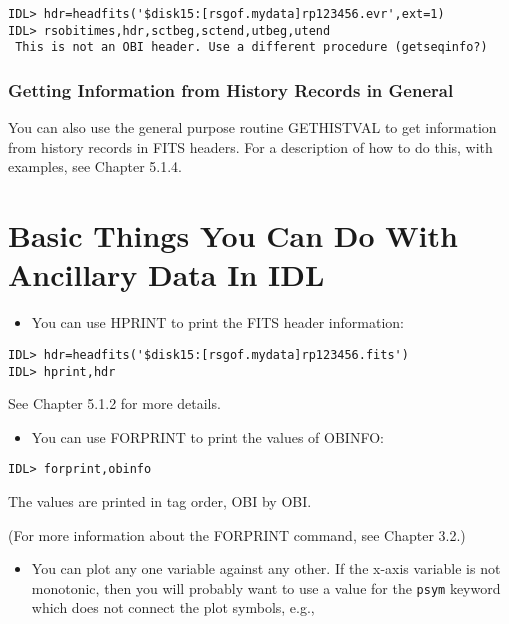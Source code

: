 \medskip\noindent
\begin{verbatim}
IDL> hdr=headfits('$disk15:[rsgof.mydata]rp123456.evr',ext=1)
IDL> rsobitimes,hdr,sctbeg,sctend,utbeg,utend
 This is not an OBI header. Use a different procedure (getseqinfo?)
\end{verbatim}
 

\subsection{Getting Information from History Records in General}
 
You can also use the general purpose routine GETHISTVAL to get information from
history records in FITS headers. For a description of how to do this, with
examples, see Chapter 5.1.4.
 
\chapter{Basic Things You Can Do With Ancillary Data In IDL }

\begin{itemize}
\item  You can use HPRINT to print the FITS header information:
\end{itemize}

\medskip\noindent
\begin{verbatim}
IDL> hdr=headfits('$disk15:[rsgof.mydata]rp123456.fits')
IDL> hprint,hdr
\end{verbatim}
See Chapter 5.1.2 for more details.

\begin{itemize}
\item  You can use FORPRINT to print the values of OBINFO:
\end{itemize}

\medskip\noindent
\begin{verbatim}
IDL> forprint,obinfo
\end{verbatim}
The values are printed in tag order, OBI by OBI.
 
(For more information about the FORPRINT command, see Chapter 3.2.)

\begin{itemize}
\item  You can plot any one variable against any other. If the x-axis variable
is not monotonic, then you will probably want to use a value for the {\tt psym}
keyword which does not connect the plot symbols, e.g.,
\end{itemize}

